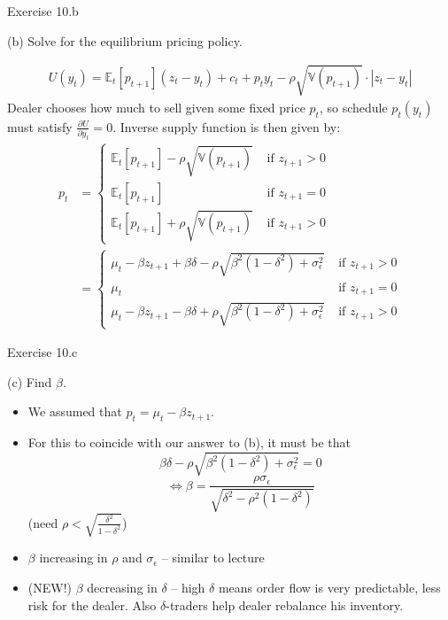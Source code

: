\documentclass[english,10pt
,aspectratio=169
]{beamer}
\begin{document}
\begin{frame}{Exercise 10.b}
	\begin{exampleblock}{}
		(b) Solve for the equilibrium pricing policy.
	\end{exampleblock}
	\vspace{-2.5em}
	\begin{align*}
		U(y_t) = \mathbb{E}_t [p_{t+1}] (z_t - y_t) + c_t + p_t y_t - \rho \sqrt{\mathbb{V}(p_{t+1})} \cdot | z_t - y_t |
	\end{align*}
	Dealer chooses how much to sell given some fixed price $p_t$, so schedule $p_t(y_t)$ must satisfy $\frac{\partial U}{\partial y_t} = 0$. Inverse supply function is then given by:
	\pause
	\vspace{-1em}
	\begin{align*}
		p_t &= 
		\begin{cases}
			\mathbb{E}_t [p_{t+1}] - \rho \sqrt{\mathbb{V}(p_{t+1})} & \text{ if } z_{t+1} > 0
			\\
			\mathbb{E}_t [p_{t+1}] & \text{ if } z_{t+1} = 0
			\\
			\mathbb{E}_t [p_{t+1}] + \rho \sqrt{\mathbb{V}(p_{t+1})} & \text{ if } z_{t+1} > 0
		\end{cases}
		\\
		&= 
		\begin{cases}
		\mu_t - \beta z_{t+1} + \beta \delta - \rho \sqrt{\beta^2 (1-\delta^2) + \sigma_\epsilon^2} & \text{ if } z_{t+1} > 0
		\\
		\mu_t & \text{ if } z_{t+1} = 0
		\\
		\mu_t - \beta z_{t+1} - \beta \delta + \rho \sqrt{\beta^2 (1-\delta^2) + \sigma_\epsilon^2} & \text{ if } z_{t+1} > 0
		\end{cases}
	\end{align*}
\end{frame}


\begin{frame}{Exercise 10.c}
	\begin{exampleblock}{}
		(c) Find $\beta$.
	\end{exampleblock}
	
	\pause
	\begin{itemize}
		\item We assumed that $p_t = \mu_t - \beta z_{t+1}$.
		\item For this to coincide with our answer to (b), it must be that 
		$$ \beta \delta - \rho \sqrt{\beta^2 (1-\delta^2) + \sigma_\epsilon^2} = 0 $$
		$$ \Leftrightarrow \beta = \frac{\rho \sigma_\epsilon}{\sqrt{\delta^2 - \rho^2(1-\delta^2)}} $$
		(need $\rho < \sqrt{\frac{\delta^2}{1 - \delta^2}}$)
		\item $\beta$ increasing in $\rho$ and $\sigma_\epsilon$ -- similar to lecture
		\item (NEW!) $\beta$ decreasing in $\delta$ -- high $\delta$ means order flow is very predictable, less risk for the dealer. Also $\delta$-traders help dealer rebalance his inventory.
	\end{itemize}
\end{frame}
\end{document}
